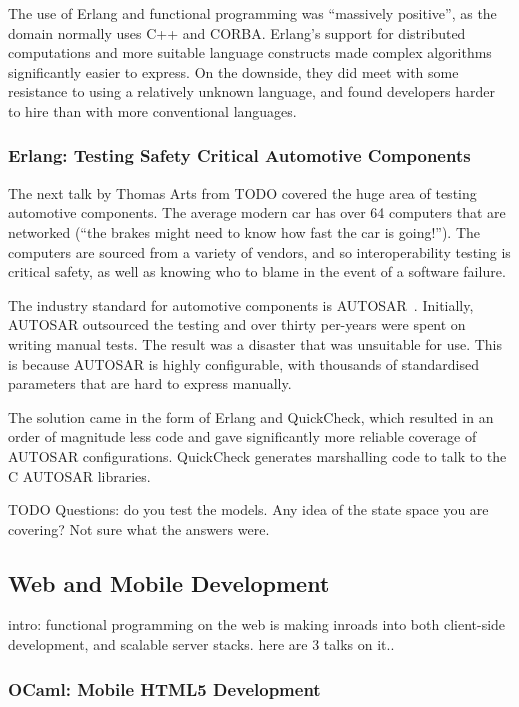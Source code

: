 \documentclass{jfp1}
\begin{document}
The use of Erlang and functional programming was ``massively positive'', as the
domain normally uses C++ and CORBA.  Erlang's support for distributed
computations and more suitable language constructs made complex algorithms
significantly easier to express.  On the downside, they did meet with some
resistance to using a relatively unknown language, and found developers harder
to hire than with more conventional languages.

\subsubsection{Erlang: Testing Safety Critical Automotive Components}

The next talk by Thomas Arts from TODO covered the huge area of testing
automotive components. The average modern car has over 64 computers that are
networked (``the brakes might need to know how fast the car is going!'').  The
computers are sourced from a variety of vendors, and so interoperability
testing is critical safety, as well as knowing who to blame in the event of a
software failure.

The industry standard for automotive components is AUTOSAR~\cite{x}. Initially,
AUTOSAR outsourced the testing and over thirty per-years were spent on writing
manual tests. The result was a disaster that was unsuitable for use. This is
because AUTOSAR is highly configurable, with thousands of standardised
parameters that are hard to express manually.

The solution came in the form of Erlang and QuickCheck, which resulted in an
order of magnitude less code and gave significantly more reliable coverage of
AUTOSAR configurations.  QuickCheck generates marshalling code to talk to the C
AUTOSAR libraries.

TODO Questions: do you test the models. Any idea of the state space you are
covering? Not sure what the answers were.

\subsection{Web and Mobile Development}

intro: functional programming on the web is making inroads into both client-side development, and scalable server stacks. here are 3 talks on it..

\subsubsection{OCaml: Mobile HTML5 Development}
\end{document}
